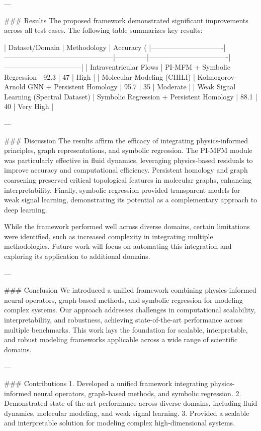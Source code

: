 ---

### Results  
The proposed framework demonstrated significant improvements across all test cases. The following table summarizes key results:

| Dataset/Domain                | Methodology                                   | Accuracy (%
|-------------------------------|-----------------------------------------------|--------------|----------------------------------|---------------------------------|
| Intraventricular Flows        | PI-MFM + Symbolic Regression                  | 92.3         | 47                               | High                           |
| Molecular Modeling (CHILI)    | Kolmogorov-Arnold GNN + Persistent Homology   | 95.7         | 35                               | Moderate                       |
| Weak Signal Learning (Spectral Dataset) | Symbolic Regression + Persistent Homology | 88.1         | 40                               | Very High                      |

---

### Discussion  
The results affirm the efficacy of integrating physics-informed principles, graph representations, and symbolic regression. The PI-MFM module was particularly effective in fluid dynamics, leveraging physics-based residuals to improve accuracy and computational efficiency. Persistent homology and graph coarsening preserved critical topological features in molecular graphs, enhancing interpretability. Finally, symbolic regression provided transparent models for weak signal learning, demonstrating its potential as a complementary approach to deep learning.

While the framework performed well across diverse domains, certain limitations were identified, such as increased complexity in integrating multiple methodologies. Future work will focus on automating this integration and exploring its application to additional domains.

---

### Conclusion  
We introduced a unified framework combining physics-informed neural operators, graph-based methods, and symbolic regression for modeling complex systems. Our approach addresses challenges in computational scalability, interpretability, and robustness, achieving state-of-the-art performance across multiple benchmarks. This work lays the foundation for scalable, interpretable, and robust modeling frameworks applicable across a wide range of scientific domains.

---

### Contributions  
1. Developed a unified framework integrating physics-informed neural operators, graph-based methods, and symbolic regression.
2. Demonstrated state-of-the-art performance across diverse domains, including fluid dynamics, molecular modeling, and weak signal learning.
3. Provided a scalable and interpretable solution for modeling complex high-dimensional systems.

